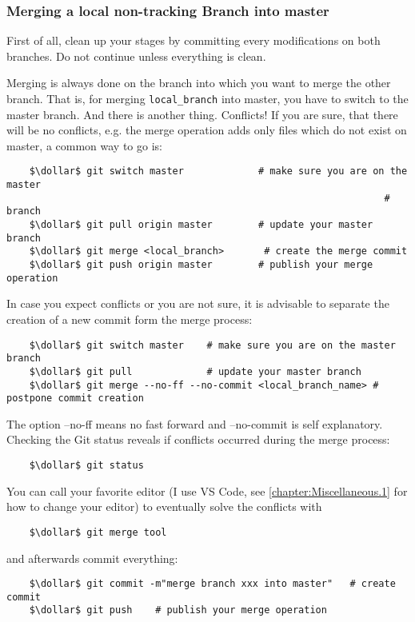\subsubsection*{Merging a local non-tracking Branch into master}


First of all, clean up your stages by committing every modifications on both branches. Do 
not continue unless everything is clean.

Merging is always done on the branch into which you 
want to merge the other branch. That is, for merging \verb|local_branch| into master, you have to switch 
to the master branch. And there is another thing. Conflicts! If you are sure, that 
there will be no conflicts, e.g. the merge operation adds only files which do not exist on master,
a common way to go is:

\begin{lstlisting}
	$\dollar$ git switch master             # make sure you are on the master 
																  # branch
	$\dollar$ git pull origin master        # update your master branch 
	$\dollar$ git merge <local_branch> 		 # create the merge commit
	$\dollar$ git push origin master        # publish your merge operation
\end{lstlisting}

In case you expect conflicts or you are not sure, it is advisable to separate the creation of 
a new commit form the merge process:
\begin{lstlisting}
	$\dollar$ git switch master    # make sure you are on the master branch 
	$\dollar$ git pull             # update your master branch
	$\dollar$ git merge --no-ff --no-commit <local_branch_name> # postpone commit creation
\end{lstlisting}

The option --no-ff means no fast forward and --no-commit is self explanatory.
Checking the Git status reveals if conflicts occurred during the merge process:
\begin{lstlisting}
	$\dollar$ git status
\end{lstlisting} 

You can call your favorite editor (I use VS Code, see \cref{chapter:Miscellaneous.1} for how to 
change your editor) to eventually solve the conflicts with
\begin{lstlisting}
	$\dollar$ git merge tool
\end{lstlisting} 
and afterwards commit everything:
\begin{lstlisting}
	$\dollar$ git commit -m"merge branch xxx into master"   # create commit  
	$\dollar$ git push    # publish your merge operation
\end{lstlisting}  

